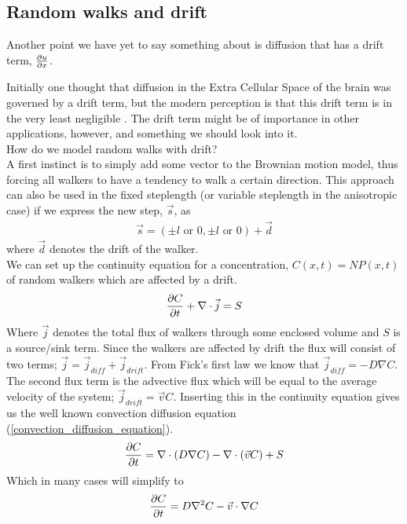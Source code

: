 \subsection{Random walks and drift}\label{random_walks_and_drift}

Another point we have yet to say something about is diffusion that has a drift term, $\frac{\partial u}{\partial x}$. 

Initially one thought that diffusion in the Extra Cellular Space of the brain was governed by a drift term, but the modern perception is that this drift term is in the very least negligible \cite{nicholson2001diffusion}.
The drift term might be of importance in other applications, however, and something we should look into it.\\
How do we model random walks with drift? \\
A first instinct is to simply add some vector to the Brownian motion model, thus forcing all walkers to have a tendency to walk a certain direction. 
This approach can also be used in the fixed steplength (or variable steplength in the anisotropic case)  if we express the new step, $\vec{s}$, as
\begin{align*}
 \vec{s} = (\pm l \text{ or }0,\pm l \text{ or }0) +\vec{d}
\end{align*}
where $\vec{d}$ denotes the drift of the walker.\\
We can set up the continuity equation for a concentration, $C(x,t) = NP(x,t)$ of random walkers which are affected by a drift.
\begin{equation}
 \frac{\partial C}{\partial t} +\nabla\cdot\vec{j} = S
\end{equation}
Where $\vec{j}$ denotes the total flux of walkers through some enclosed volume and $S$ is a source/sink term. 
Since the walkers are affected by drift the flux will consist of two terms; $\vec{j} = \vec{j}_{diff}+\vec{j}_{drift}$. 
From Fick's first law we know that $\vec{j}_{diff} = -D\nabla C$. 
The second flux term is the advective flux which will be equal to the average velocity of the system; $\vec{j}_{drift} = \vec{v}C$. 
Inserting this in the continuity equation gives us the well known convection diffusion equation (\ref{convection_diffusion_equation}).
\begin{equation}\label{convection_diffusion_equation}
 \frac{\partial C}{\partial t} = \nabla\cdot\left(D\nabla C\right)-\nabla\cdot\left(\vec{v}C\right) + S
\end{equation}
Which in many cases will simplify to
\begin{equation}
 \frac{\partial C}{\partial t} = D\nabla^2 C-\vec{v}\cdot\nabla C
\end{equation}

